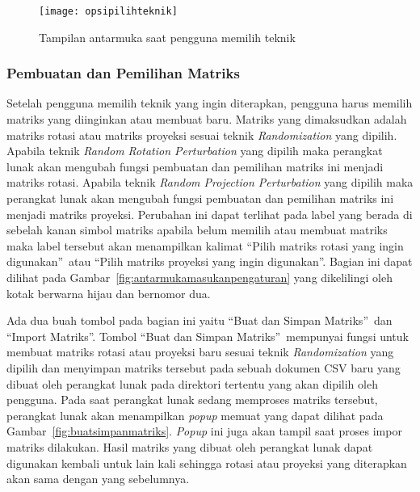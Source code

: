 \begin{figure}
	\centering
	\texttt{[image: opsipilihteknik]}
	\caption{Tampilan antarmuka saat pengguna memilih teknik}
	\label{fig:opsipilihteknik}
\end{figure}

\subsubsection{Pembuatan dan Pemilihan Matriks}
\label{subsubsec:pilihmatriks}

Setelah pengguna memilih teknik yang ingin diterapkan, pengguna harus memilih matriks yang diinginkan atau membuat baru. Matriks yang dimaksudkan adalah matriks rotasi atau matriks proyeksi sesuai teknik \textit{Randomization} yang dipilih. Apabila teknik \textit{Random Rotation Perturbation} yang dipilih maka perangkat lunak akan mengubah fungsi pembuatan dan pemilihan matriks ini menjadi matriks rotasi. Apabila teknik \textit{Random Projection Perturbation} yang dipilih maka perangkat lunak akan mengubah fungsi pembuatan dan pemilihan matriks ini menjadi matriks proyeksi. Perubahan ini dapat terlihat pada label yang berada di sebelah kanan simbol matriks apabila belum memilih atau membuat matriks maka label tersebut akan menampilkan kalimat \textquotedblleft Pilih matriks rotasi yang ingin digunakan\textquotedblright~atau \textquotedblleft Pilih matriks proyeksi yang ingin digunakan\textquotedblright. Bagian ini dapat dilihat pada Gambar~\ref{fig:antarmukamasukanpengaturan} yang dikelilingi oleh kotak berwarna hijau dan bernomor dua.

Ada dua buah tombol pada bagian ini yaitu \textquotedblleft Buat dan Simpan Matriks\textquotedblright~dan \textquotedblleft Import Matriks\textquotedblright. Tombol \textquotedblleft Buat dan Simpan Matriks\textquotedblright~mempunyai fungsi untuk membuat matriks rotasi atau proyeksi baru sesuai teknik \textit{Randomization} yang dipilih dan menyimpan matriks tersebut pada sebuah dokumen CSV baru yang dibuat oleh perangkat lunak pada direktori tertentu yang akan dipilih oleh pengguna. Pada saat perangkat lunak sedang memproses matriks tersebut, perangkat lunak akan menampilkan \textit{popup} memuat yang dapat dilihat pada Gambar~\ref{fig:buatsimpanmatriks}. \textit{Popup} ini juga akan tampil saat proses impor matriks dilakukan. Hasil matriks yang dibuat oleh perangkat lunak dapat digunakan kembali untuk lain kali sehingga rotasi atau proyeksi yang diterapkan akan sama dengan yang sebelumnya. 

